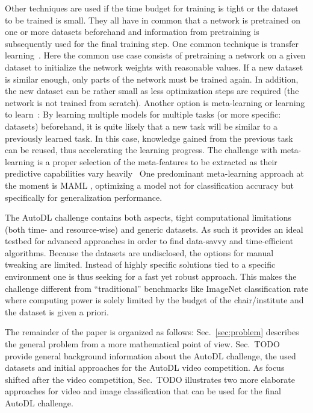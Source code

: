 \documentclass{article}
\begin{document}
Other techniques are used if the time budget for training is tight or the dataset to be trained is small. They all have in common that a network is pretrained on one or more datasets beforehand and information from pretraining is subsequently used for the final training step. One common technique is transfer learning~\cite{pan10}. Here the common use case consists of pretraining a network on a given dataset to initialize the network weights with reasonable values. If a new dataset is similar enough, only parts of the network must be trained again. In addition, the new dataset can be rather small as less optimization steps are required (the network is not trained from scratch). Another option is meta-learning or learning to learn~\cite{santoro16,hutter19}: By learning multiple models for multiple tasks (or more specific: datasets) beforehand, it is quite likely that a new task will be similar to a previously learned task. In this case, knowledge gained from the previous task can be reused, thus accelerating the learning progress. The challenge with meta-learning is a proper selection of the meta-features to be extracted as their predictive capabilities vary heavily~\cite{bilalli17}
One predominant meta-learning approach at the moment is MAML \cite{finn17}, optimizing a model not for classification accuracy but specifically for generalization performance. 

The AutoDL challenge contains both aspects, tight computational limitations (both time- and resource-wise) and generic datasets. As such it provides an ideal testbed for advanced approaches in order to find data-savvy and time-efficient algorithms. Because the datasets are undisclosed, the options for manual tweaking are limited. Instead of highly specific solutions tied to a specific environment one is thus seeking for a fast yet robust approach. This makes the challenge different from ``traditional'' benchmarks like ImageNet classification rate where computing power is solely limited by the budget of the chair/institute and the dataset is given a priori. 

The remainder of the paper is organized as follows: Sec.~\ref{sec:problem} describes the general problem from a more mathematical point of view. Sec.~TODO provide general background information about the AutoDL challenge, the used datasets and initial approaches for the AutoDL video competition. As focus shifted after the video competition, Sec.~TODO illustrates two more elaborate approaches for video and image classification that can be used for the final AutoDL challenge. 
\end{document}
